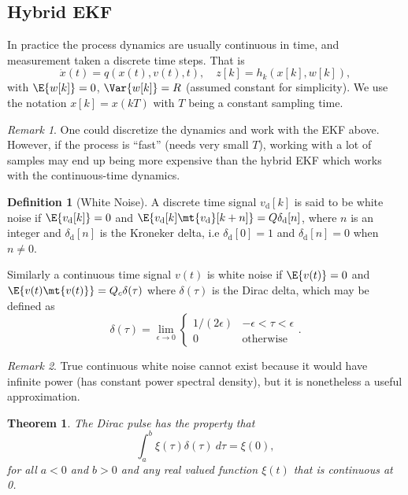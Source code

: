 \documentclass[]{hsrzf}
\theoremstyle{plain}
\newtheorem{thm}{Theorem}[section]
\theoremstyle{definition}
\newtheorem{defn}{Definition}[section]
\theoremstyle{remark}
\newtheorem*{remark}{Remark}
\begin{document}
\subsection{Hybrid EKF}

In practice the process dynamics are usually continuous in time, and
measurement taken a discrete time steps. That is
\[
  \dot{x}(t) = q(x(t), v(t), t),
  \quad z[k] = h_k(x[k], w[k]),
\]
with $\E{w[k]} = 0$, $\Var{w[k]} = R$ (assumed constant for simplicity). We
use the notation $x[k] = x(kT)$ with $T$ being a constant sampling time.

\begin{remark}
  One could discretize the dynamics and work with the EKF above. However, if
  the process is ``fast'' (needs very small $T$), working with a lot of
  samples may end up being more expensive than the hybrid EKF which works with
  the continuous-time dynamics.
\end{remark}

\begin{defn}[White Noise]
  A discrete time signal $v_\mathrm{d}[k]$ is said to be white noise if
  $\E{v_\mathrm{d}[k]} = 0$ and \allowbreak$\E{v_\mathrm{d}[k]
  \mt{v_\mathrm{d}}[k+n]} = Q\delta_\mathrm{d}[n]$, where $n$ is an integer
  and $\delta_\mathrm{d}[n]$ is the Kroneker delta, i.e $\delta_\mathrm{d}[0]
  = 1$ and $\delta_\mathrm{d}[n] = 0$ when $n \neq 0$.

  Similarly a continuous time signal $v(t)$ is white noise if $\E{v(t)} = 0$
  and $\E{v(t) \mt{v(t)}} = Q_c \delta(\tau)$ where $\delta(\tau)$ is the
  Dirac delta, which may be defined as
  \[
    \delta(\tau) = \lim_{\epsilon \to 0} \begin{cases}
      1/(2\epsilon) & -\epsilon < \tau < \epsilon \\
      0 & \text{otherwise}
    \end{cases}.
  \]
\end{defn}

\begin{remark}
  True continuous white noise cannot exist because it would have infinite
  power (has constant power spectral density), but it is nonetheless a useful
  approximation.
\end{remark}

\begin{thm}
  The Dirac pulse has the property that
  \[
    \int_a^b \xi(\tau) \delta(\tau) ~d\tau = \xi(0),
  \]
  for all $a < 0$ and $b > 0$ and any real valued function $\xi(t)$ that is
  continuous at 0.
\end{thm}
\end{document}
